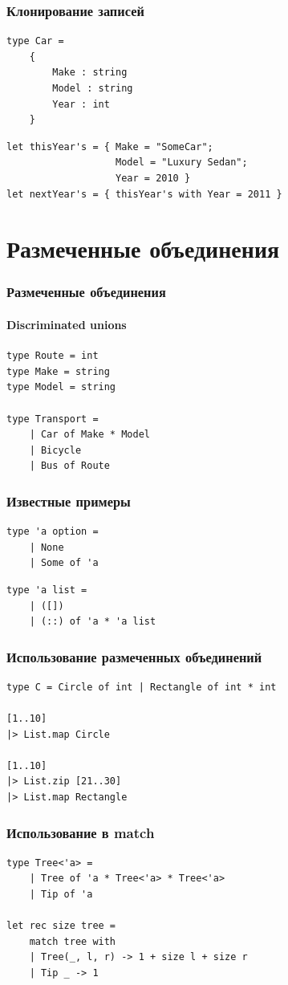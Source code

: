 \documentclass[xetex,mathserif,serif]{beamer}
\begin{document}
	\begin{frame}[fragile]
		\frametitle{Клонирование записей}
		\begin{verbatim}
type Car =
    {
        Make : string
        Model : string
        Year : int
    }
		\end{verbatim}
		
		\begin{verbatim}
let thisYear's = { Make = "SomeCar"; 
                   Model = "Luxury Sedan"; 
                   Year = 2010 }
let nextYear's = { thisYear's with Year = 2011 }
		\end{verbatim}
\end{frame}

	\section{Размеченные объединения}
	
	\begin{frame}[fragile]
		\frametitle{Размеченные объединения}
		\framesubtitle{Discriminated unions}
		\begin{verbatim}
type Route = int
type Make = string
type Model = string

type Transport =
    | Car of Make * Model
    | Bicycle
    | Bus of Route
		\end{verbatim}
\end{frame}

	\begin{frame}[fragile]
		\frametitle{Известные примеры}
		\begin{verbatim}
type 'a option =
    | None
    | Some of 'a
		\end{verbatim}

		\begin{verbatim}
type 'a list =
    | ([])
    | (::) of 'a * 'a list
		\end{verbatim}
\end{frame}

	\begin{frame}[fragile]
		\frametitle{Использование размеченных объединений}
		\begin{verbatim}
type C = Circle of int | Rectangle of int * int

[1..10]
|> List.map Circle

[1..10]
|> List.zip [21..30]
|> List.map Rectangle
		\end{verbatim}
\end{frame}

	\begin{frame}[fragile]
		\frametitle{Использование в match}
		\begin{verbatim}
type Tree<'a> =
    | Tree of 'a * Tree<'a> * Tree<'a>
    | Tip of 'a

let rec size tree =
    match tree with
    | Tree(_, l, r) -> 1 + size l + size r
    | Tip _ -> 1
		\end{verbatim}
\end{frame}
\end{document}
